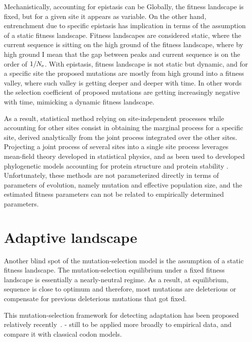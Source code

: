 Mechanistically, accounting for epistasis can be 
Globally, the fitness landscape is fixed, but for a given site it appears as variable.
On the other hand, entrenchment due to specific epistasis has implication in terms of the assumption of a static fitness landscape.
Fitness landscapes are considered static, where the current sequence is sitting on the high ground of the fitness landscape, where by high ground I mean that the gap between peaks and current sequence is on the order of $1 / N_{\textrm{e}}$.
With epistasis, fitness landscape is not static but dynamic, and for a specific site the proposed mutations are mostly from high ground into a fitness valley, where such valley is getting deeper and deeper with time.
In other words the selection coefficient of proposed mutations are getting increasingly negative with time, mimicking a dynamic fitness landscape.

As a result, statistical method relying on site-independent processes while accounting for other sites consist in obtaining the marginal process for a specific site, derived analytically from the joint process integrated over the other sites.
Projecting a joint process of several sites into a single site process leverages mean-field theory developed in statistical physics, and as been used to developed phylogenetic models accounting for protein structure \citep{Chi2018} and protein stability \citep{Arenas2015a, Arenas2017}.
Unfortunately, these methods are not parameterized directly in terms of parameters of evolution, namely mutation and effective population size, and the estimated fitness parameters can not be related to empirically determined parameters. 


\section{Adaptive landscape}
\label{sec:adaptative-landscape}

Another blind spot of the mutation-selection model is the assumption of a static fitness landscape.
The mutation-selection equilibrium under a fixed fitness landscape is essentially a nearly-neutral regime.
As a result, at equilibrium, sequence is close to optimum and therefore, most mutations are deleterious or compensate for previous deleterious mutations that got fixed.

This mutation-selection framework for detecting adaptation has been proposed relatively recently~\citep{Rodrigue2016}.
- still to be applied more broadly to empirical data, and compare it with classical codon models.


